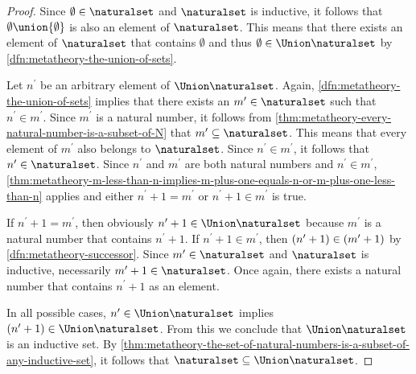 \begin{proof}
    Since \( \emptyset \in \naturalset \) and \( \naturalset \) is inductive, it follows that \( \emptyset \union \mleft\{ \emptyset \mright\} \) is also
    an element of \( \naturalset \).
    This means that there exists an element of \( \naturalset \) that contains \( \emptyset \) and thus \( \emptyset \in \Union \naturalset \)
    by \cref{dfn:metatheory-the-union-of-sets}.

    \vspace{0.3cm}
    \noindent
    Let \( n^{\prime} \) be an arbitrary element of \( \Union \naturalset \).
    Again, \cref{dfn:metatheory-the-union-of-sets} implies that there exists an \( m^{\prime} \in \naturalset \) such that
    \( n^{\prime} \in m^{\prime} \).
    Since \( m^{\prime} \) is a natural number, it follows from \cref{thm:metatheory-every-natural-number-is-a-subset-of-N} that
    \( m^{\prime} \subseteq \naturalset \). This means that every element of \( m^{\prime} \) also belongs to \( \naturalset \).
    Since \( n^{\prime} \in m^{\prime} \), it follows that \( n^{\prime} \in \naturalset \).
    Since \( n^{\prime} \) and \( m^{\prime} \) are both natural numbers and \( n^{\prime} \in m^{\prime} \),
    \cref{thm:metatheory-m-less-than-n-implies-m-plus-one-equals-n-or-m-plus-one-less-than-n} applies and 
    either \( n^{\prime} + 1 = m^{\prime} \) or \( n^{\prime} + 1 \in m^{\prime} \) is true.

    \vspace{0.3cm}
    \noindent
    If \( n^{\prime} + 1 = m^{\prime} \), then obviously \( n^{\prime} + 1 \in \Union \naturalset \) because \( m^{\prime} \) is a natural number that contains
    \( n^{\prime} + 1 \).
    If \( n^{\prime} + 1 \in m^{\prime} \), then \( \mleft( n^{\prime} + 1 \mright) \in \mleft( m^{\prime} + 1 \mright) \) by \cref{dfn:metatheory-successor}.
    Since \( m^{\prime} \in \naturalset \) and \( \naturalset \) is inductive, necessarily \( m^{\prime} + 1 \in \naturalset \).
    Once again, there exists a natural number that contains \( n^{\prime} + 1 \) as an element.

    \vspace{0.3cm}
    \noindent
    In all possible cases, \( n^{\prime} \in \Union \naturalset \) implies \( \mleft( n^{\prime} + 1 \mright) \in \Union \naturalset \).
    From this we conclude that \( \Union \naturalset \) is an inductive set.
    By \cref{thm:metatheory-the-set-of-natural-numbers-is-a-subset-of-any-inductive-set}, it follows that \( \naturalset \subseteq \Union \naturalset \).


\end{proof}
